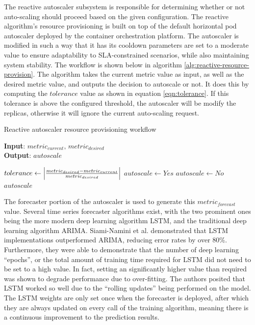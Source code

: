 The reactive autoscaler subsystem is responsible for determining whether or not auto-scaling should proceed based on the given configuration. The reactive algorithm's resource provisioning is built on top of the default horizontal pod autoscaler deployed by the container orchestration platform. The autoscaler is modified in such a way that it has its cooldown parameters are set to a moderate value to ensure adaptability to SLA-constrained scenarios, while also maintaining system stability. The workflow is shown below in algorithm \ref{alg:reactive-resource-provision}. The algorithm takes the current metric value as input, as well as the desired metric value, and outputs the decision to autoscale or not. It does this by computing the $tolerance$ value as shown in equation \ref{eqn:tolerance}. If this tolerance is above the configured threshold, the autoscaler will be modify the replicas, otherwise it will ignore the current auto-scaling request.\par

\begin{algorithm}
    \caption{Reactive autoscaler resource provisioning workflow}
    \label{alg:reactive-resource-provision}
    \textbf{Input}: $metric_{current},\, metric_{desired}$\\
    \textbf{Output}: $autoscale$
    \begin{algorithmic}
        \State $tolerance \gets \abs{ \frac{metric_{desired} - metric_{current}}{metric_{desired}} }$
            \State $autoscale \gets Yes$
        \Else
            \State $autoscale \gets No$
        \EndIf
        \State \Return $autoscale$
    \end{algorithmic}
\end{algorithm}

The forecaster portion of the autoscaler is used to generate this $metric_{forecast}$ value. Several time series forecaster algorithms exist, with the two prominent ones being the more modern deep learning algorithm LSTM, and the traditional deep learning algorithm ARIMA. Siami-Namini et al. \cite{siami2018comparison} demonstrated that LSTM implementations outperformed ARIMA, reducing error rates by over 80\%. Furthermore, they were able to demonstrate that the number of deep learning ``epochs'', or the total amount of training time required for LSTM did not need to be set to a high value. In fact, setting an significantly higher value than required was shown to degrade performance due to over-fitting. The authors posited that LSTM worked so well due to the ``rolling updates'' being performed on the model. The LSTM weights are only set once when the forecaster is deployed, after which they are always updated on every call of the training algorithm, meaning there is a continuous improvement to the prediction results.\par

